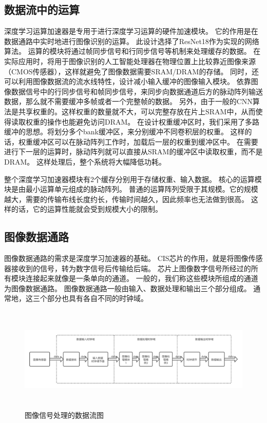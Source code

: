 \subsection{数据流中的运算}
深度学习运算加速器是专用于进行深度学习运算的硬件加速模块。
它的作用是在数据通路中实时地进行图像识别的运算。
此设计选择了ResNet18作为实现的网络算法。
运算的模块将通过帧同步信号和行同步信号等机制来处理缓存的数据。
在实际应用时，将用于图像识别的人工智能处理器在物理位置上比较靠近图像来源（CMOS传感器），这样就避免了图像数据需要SRAM/DRAM的存储。
同时，还可以利用图像数据流的流水线特性，设计减小输入缓冲的图像输入模块。
依靠图像数据信号中的行同步信号和帧同步信号，来同步向数据通道后方的脉动阵列输送数据，那么就不需要缓冲多帧或者一个完整帧的数据。
另外，由于一般的CNN算法是共享权重的。这样权重的数量就不大，可以完整存放在片上SRAM中，从而使得读取权重的操作也能避免访问DRAM。
在设计权重缓冲区时，我们采用了多路缓冲的思想。将划分多个bank缓冲区，来分别缓冲不同卷积层的权重。
这样的话，权重缓冲区可以在脉动阵列工作时，加载后一层的权重到缓冲区中。
在需要进行下一层的运算时，脉动阵列就可以直接从SRAM的缓冲区中读取权重，而不是DRAM。
这样处理后，整个系统将大幅降低功耗。

整个深度学习加速器模块有2个缓存分别用于存储权重、输入数据。
核心的运算模块是由最小运算单元组成的脉动阵列。
普通的运算阵列受限于其规模。它的规模越大，需要的传输布线长度约长，传输时间越久，因此频率也无法做到很高。
这样的话，它的运算性能就会受到规模大小的限制。



\subsection{图像数据通路}
图像数据通路的需求是深度学习加速器的基础。
CIS芯片的作用，就是将图像传感器接收到的信号，转为数字信号后传输给后端。
芯片上图像数字信号所经过的所有模块连接起来就像是一条单向的通道。
一般的，我们称这些模块所组成的通道为图像数据通路。
图像数据通路一般由输入、数据处理和输出三个部分组成。
通常地，这三个部分也具有各自不同的时钟域。

\begin{figure}[htbp]
    \centering
    \includegraphics[width=15cm,height=5cm]{figures/datapath.png}
    \caption{图像信号处理的数据流图}
    \label{fig:datapath}
\end{figure}

